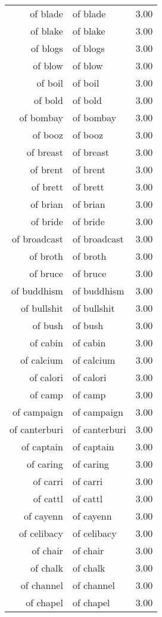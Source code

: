\begin{table}[ht]
\begin{tabular}{rlr}
  of blade & of blade & 3.00 \\ 
  of blake & of blake & 3.00 \\ 
  of blogs & of blogs & 3.00 \\ 
  of blow & of blow & 3.00 \\ 
  of boil & of boil & 3.00 \\ 
  of bold & of bold & 3.00 \\ 
  of bombay & of bombay & 3.00 \\ 
  of booz & of booz & 3.00 \\ 
  of breast & of breast & 3.00 \\ 
  of brent & of brent & 3.00 \\ 
  of brett & of brett & 3.00 \\ 
  of brian & of brian & 3.00 \\ 
  of bride & of bride & 3.00 \\ 
  of broadcast & of broadcast & 3.00 \\ 
  of broth & of broth & 3.00 \\ 
  of bruce & of bruce & 3.00 \\ 
  of buddhism & of buddhism & 3.00 \\ 
  of bullshit & of bullshit & 3.00 \\ 
  of bush & of bush & 3.00 \\ 
  of cabin & of cabin & 3.00 \\ 
  of calcium & of calcium & 3.00 \\ 
  of calori & of calori & 3.00 \\ 
  of camp & of camp & 3.00 \\ 
  of campaign & of campaign & 3.00 \\ 
  of canterburi & of canterburi & 3.00 \\ 
  of captain & of captain & 3.00 \\ 
  of caring & of caring & 3.00 \\ 
  of carri & of carri & 3.00 \\ 
  of cattl & of cattl & 3.00 \\ 
  of cayenn & of cayenn & 3.00 \\ 
  of celibacy & of celibacy & 3.00 \\ 
  of chair & of chair & 3.00 \\ 
  of chalk & of chalk & 3.00 \\ 
  of channel & of channel & 3.00 \\ 
  of chapel & of chapel & 3.00 \\ 

\end{tabular}
\end{table}
